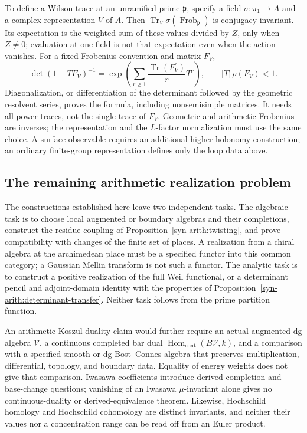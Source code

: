 To define a Wilson trace at an unramified prime $\mathfrak p$, specify a
field $\sigma:\pi_1\to A$ and a complex representation $V$ of $A$.
Then $\operatorname{Tr}_V\sigma(\operatorname{Frob}_{\mathfrak p})$ is
conjugacy-invariant.  Its expectation is the weighted sum of these values
divided by $Z$, only when $Z\ne0$; evaluation at one field is not that
expectation even when the action vanishes.
For a fixed Frobenius convention and matrix $F_V$,
\[
 \det(1-TF_V)^{-1}
 =\exp\left(\sum_{r\geq1}\frac{\operatorname{Tr}(F_V^r)}rT^r\right),
 \qquad |T|\,\rho(F_V)<1.
\]
Diagonalization, or differentiation of the determinant followed by the
geometric resolvent series, proves the formula, including nonsemisimple
matrices.  It needs all power traces, not the single trace of $F_V$.
Geometric and arithmetic Frobenius are inverses; the representation and
the $L$-factor normalization must use the same choice.
A surface observable requires an additional higher holonomy construction;
an ordinary finite-group representation defines only the loop data above.

\subsection{The remaining arithmetic realization problem}
\label{syn-arith:realization-problem}
The constructions established here leave two independent tasks.
The algebraic task is to choose local augmented or boundary algebras and
their completions, construct the residue coupling of
Proposition~\ref{syn-arith:twisting}, and prove compatibility with changes
of the finite set of places.  A realization from a chiral algebra at the
archimedean place must be a specified functor into this common category;
a Gaussian Mellin transform is not such a functor.
The analytic task is to construct a positive realization of the full Weil
functional, or a determinant pencil and adjoint-domain identity with the
properties of Proposition~\ref{syn-arith:determinant-transfer}.
Neither task follows from the prime partition function.

An arithmetic Koszul-duality claim would further require an actual
augmented dg algebra $\mathcal V$, a continuous completed bar dual
$\operatorname{Hom}_{\mathrm{cont}}(B\mathcal V,k)$, and a comparison with
a specified smooth or dg Bost--Connes algebra that preserves multiplication,
differential, topology, and boundary data.  Equality of energy weights does
not give that comparison.  Iwasawa coefficients introduce derived
completion and base-change questions; vanishing of an Iwasawa $\mu$-invariant
alone gives no continuous-duality or derived-equivalence theorem.
Likewise, Hochschild homology and Hochschild cohomology are distinct
invariants, and neither their values nor a concentration range can be
read off from an Euler product.

